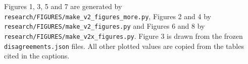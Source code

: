 \documentclass[11pt,a4paper]{article}
\begin{document}
Figures 1, 3, 5 and 7 are generated by \texttt{research/\allowbreak{}FIGURES/\allowbreak{}make\_\allowbreak{}v2\_\allowbreak{}figures\_\allowbreak{}more.\allowbreak{}py}, Figures 2 and 4 by \texttt{research/\allowbreak{}FIGURES/\allowbreak{}make\_\allowbreak{}v2\_\allowbreak{}figures.\allowbreak{}py} and Figures 6 and 8 by \texttt{research/\allowbreak{}FIGURES/\allowbreak{}make\_\allowbreak{}v2x\_\allowbreak{}figures.\allowbreak{}py}. Figure 3 is drawn from the frozen \texttt{disagreements.\allowbreak{}json} files. All other plotted values are copied from the tables cited in the captions.
\end{document}
